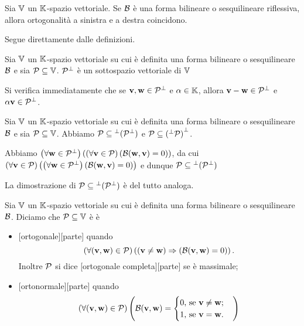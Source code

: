 \begin{Theorem}
	Sia $\mathbb{V}$ un $\mathbb{K}$-spazio vettoriale. Se $\mathcal{B}$ \`e una forma bilineare o sesquilineare riflessiva, allora ortogonalit\`a a sinistra e a destra coincidono.
\end{Theorem}
\Proof Segue direttamente dalle definizioni. \EndProof
\begin{Theorem}
	Sia $\mathbb{V}$ un $\mathbb{K}$-spazio vettoriale su cui \`e definita una forma bilineare o sesquilineare $\mathcal{B}$ e sia $\mathcal{P} \subseteq \mathbb{V}$. ${\mathcal{P}}^\perp$ \`e un sottospazio vettoriale di $\mathbb{V}$
\end{Theorem}
\Proof Si verifica immediatamente che se $\mathbf{v}, \mathbf{w} \in {\mathcal{P}}^\perp$ e $\alpha \in \mathbb{K}$, allora $\mathbf{v} - \mathbf{w} \in {\mathcal{P}}^\perp$ e $\alpha \mathbf{v} \in {\mathcal{P}}^\perp$. \EndProof
\begin{Theorem}
	Sia $\mathbb{V}$ un $\mathbb{K}$-spazio vettoriale su cui \`e definita una forma bilineare o sesquilineare $\mathcal{B}$ e sia $\mathcal{P} \subseteq \mathbb{V}$. Abbiamo $\mathcal{P} \subseteq {}^\perp ({\mathcal{P}}^\perp)$ e $\mathcal{P} \subseteq {({}^\perp \mathcal{P})}^\perp$.
\end{Theorem}
\Proof Abbiamo $\left ( \forall \mathbf{w} \in {\mathcal{P}}^\perp \right ) \left ( \left ( \forall \mathbf{v} \in \mathcal{P} \right ) \left ( \mathcal{B}(\mathbf{w},\mathbf{v}) = 0 \right ) \right )$, da cui $\left ( \forall \mathbf{v} \in \mathcal{P} \right ) \left ( \left ( \forall \mathbf{w} \in {\mathcal{P}}^\perp \right ) \left ( \mathcal{B}(\mathbf{w},\mathbf{v}) = 0 \right ) \right )$ e dunque $\mathcal{P} \subseteq {}^\perp ({\mathcal{P}}^\perp)$
\par La dimostrazione di $\mathcal{P} \subseteq {}^\perp ({\mathcal{P}}^\perp)$ \`e del tutto analoga. \EndProof
\begin{Definition}
	Sia $\mathbb{V}$ un $\mathbb{K}$-spazio vettoriale su cui \`e definita una forma
  bilineare o sesquilineare $\mathcal{B}$. Diciamo che
  $\mathcal{P} \subseteq \mathbb{V}$ \`e
  \`e
	\begin{itemize}
		\item {}[ortogonale][parte] quando
      \[
        \left ( \forall (\mathbf{v},\mathbf{w}) \in \mathcal{P} \right ) \left ( \left ( \mathbf{v} \neq \mathbf{w} \right ) \Rightarrow \left ( \mathcal{B}(\mathbf{v},\mathbf{w}) = 0 \right ) \right ).
      \]
      Inoltre $\mathcal{P}$ si dice [ortogonale completa][parte] se
      \`e massimale;
		\item {}[ortonormale][parte] quando
      \[
        \left ( \forall (\mathbf{v},\mathbf{w}) \in \mathcal{P} \right ) \left ( \mathcal{B}(\mathbf{v},\mathbf{w})
            = \begin{cases}
                0\text{, se }\mathbf{v} \neq \mathbf{w};\\
                1\text{, se }\mathbf{v} = \mathbf{w}.
              \end{cases} \right )
      \]
	\end{itemize}
\end{Definition}
